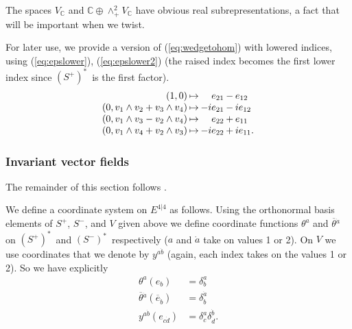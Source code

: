 \documentclass[twoside]{amsart}
\newcommand{\tighten}{\setlength{\arraycolsep}{1pt}}
\newcommand{\CC}{\ensuremath{\mathbb{C}}}
\renewcommand{\eqref}[1]{(\ref{eq:#1})}
\newcommand{\enm}[1]{\ensuremath{#1}}
\newcommand{\superijk}[3]{\enm{{#1}^{#2|#3}}}
\newcommand{\rrij}[2]{\superijk{E}{#1}{#2}}
\renewcommand{\bar}[1]{\overline{#1}}
\newcommand{\cjsup}[2]{\enm{\bar#1{} ^{{\dot{#2 }}}}} %
\newcommand{\cjsub}[2]{\enm{\bar#1{} _{{\dot{#2 }}}}} %
\newcommand{\spl}{\enm{S^{+}}}
\newcommand{\sm}{\enm{S^{-}}}
\newcommand{\spd}{\enm{(\spl)^{*}}}
\newcommand{\smd}{\enm{(\sm)^{*}}}
\newcommand{\bothlowerabc}[3]{\enm{{#1}_{#2 #3}}}
\renewcommand{\ell}[2]{\bothlowerabc{e}{#1}{#2}}
\newcommand{\susols}{\cite{susols}}
\begin{document}
The spaces \( V_{\CC} \) and \( \CC\oplus\wedge^{2}_{+}V_{\CC} \) have
obvious real subrepresentations, a fact that will be important when
we twist.

For later use, we provide a version of \eqref{wedgetohom} with
lowered indices, using \eqref{epslower}, \eqref{epslower2}
(the raised index becomes the first lower index since \spd\ is the
first factor).
\begin{equation}
    \label{eq:wedgetohomlower}
    \tighten{
    \begin{array}{rcrcl}
        (1, 0) & \mapsto &
        \ell{2}{1} & - & \ell{1}{2} \\
        (0, v_{1}\wedge v_{2} + v_{3}\wedge v_{4}) & \mapsto &
        -i\ell{2}{1} & - & i\ell{1}{2} \\
        (0, v_{1}\wedge v_{3} - v_{2}\wedge v_{4}) & \mapsto &
        \ell{2}{2} & + & \ell{1}{1} \\
        (0, v_{1}\wedge v_{4} + v_{2}\wedge v_{3}) & \mapsto &
        -i\ell{2}{2} & + & i\ell{1}{1}.
    \end{array}}
 \end{equation}

\subsubsection{Invariant vector fields}
The remainder of this section follows \susols.

We define a coordinate system on \rrij{4}{4} as follows.  Using the
orthonormal basis elements of \spl, \sm, and \( V \) given above we
define coordinate functions \( \theta^{a} \) and \( \cjsup{\theta}{a}
\) on \spd\ and \smd\ respectively (\( a \) and \( \dot{a} \) take on
values 1 or 2).  On \( V \) we use coordinates that we denote by \(
y^{a\dot{b}} \) (again, each index takes on the values 1 or 2). So we
have explicitly
\begin{align}
    \theta^{a}(e_{b}) &= \delta^{a}_{b} \\
    \cjsup{\theta}{a}(\cjsub{e}{b}) &= \delta^{\dot{a}}_{\dot{b}} \\
    y^{a\dot{b}}(e_{c\dot{d}}) &=
\delta^{a}_{c}\delta^{\dot{b}}_{\dot{d}}.
\end{align}
\end{document}
